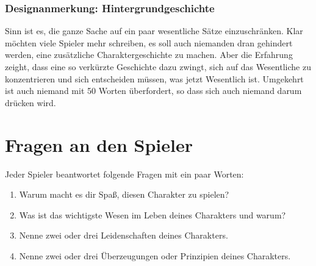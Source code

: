 \begin{design}
\subsubsection{Designanmerkung: Hintergrundgeschichte}
Sinn ist es, die ganze Sache auf ein paar wesentliche Sätze einzuschränken. Klar möchten viele Spieler mehr schreiben, es soll auch niemanden dran gehindert werden, eine zusätzliche Charaktergeschichte zu machen. Aber die Erfahrung zeight, dass eine so verkürzte Geschichte dazu zwingt, sich auf das Wesentliche zu konzentrieren und sich entscheiden müssen, was jetzt Wesentlich ist. Umgekehrt ist auch niemand mit 50 Worten überfordert, so dass sich auch niemand darum drücken wird.
\end{design}



\section{Fragen an den Spieler}
Jeder Spieler beantwortet folgende Fragen mit ein paar Worten:
\begin{enumerate}
  \item Warum macht es dir Spaß, diesen Charakter zu spielen?

  \item Was ist das wichtigste Wesen im Leben deines Charakters und warum?

  \item Nenne zwei oder drei Leidenschaften deines Charakters.

  \item Nenne zwei oder drei Überzeugungen oder Prinzipien deines Charakters.
\end{enumerate}

